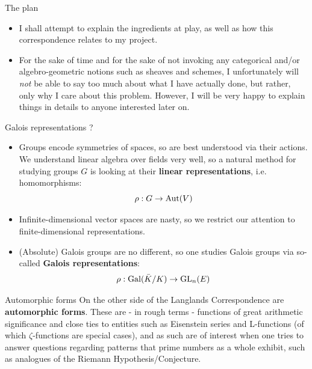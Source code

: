 \documentclass[professionalfonts]{beamer}
\begin{document}
    \begin{frame}{The plan}
        \begin{itemize}
            \item I shall attempt to explain the ingredients at play, as well as how this correspondence relates to my project.
            \item For the sake of time and for the sake of not invoking any categorical and/or algebro-geometric notions such as sheaves and schemes, I unfortunately will \textit{not} be able to say too much about what I have actually done, but rather, only why I care about this problem. However, I will be very happy to explain things in details to anyone interested later on.
        \end{itemize}
    \end{frame}
    
    \begin{frame}{Galois representations ?}
        \begin{itemize}
            \item Groups encode symmetries of spaces, so are best understood via their actions. We understand linear algebra over fields very well, so a natural method for studying groups $G$ is looking at their \textbf{linear representations}, i.e. homomorphisms:
                $$\rho: G \to \mathrm{Aut}(V)$$
            \item Infinite-dimensional vector spaces are nasty, so we restrict our attention to finite-dimensional representations.
            \item (Absolute) Galois groups are no different, so one studies Galois groups via so-called \textbf{Galois representations}:
                $$\rho: \mathrm{Gal}(\bar{K}/K) \to \operatorname{GL}_n(E)$$
        \end{itemize}
    \end{frame}
    
    \begin{frame}{Automorphic forms}
        On the other side of the Langlands Correspondence are \textbf{automorphic forms}. These are - in rough terms - functions of great arithmetic significance and close ties to entities such as Eisenstein series and L-functions (of which $\zeta$-functions are special cases), and as such are of interest when one tries to answer questions regarding patterns that prime numbers as a whole exhibit, such as analogues of the Riemann Hypothesis/Conjecture.
    \end{frame}
    
\end{document}
